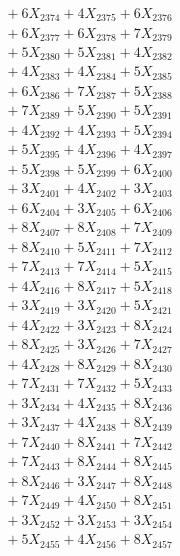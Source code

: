 \documentclass[a4paper,10pt]{article}
\begin{document}
{\begin{align}
&\;  + 6 X_{2374} + 4 X_{2375} + 6 X_{2376} \\[0.3ex]
&\;  + 6 X_{2377} + 6 X_{2378} + 7 X_{2379} \\[0.5ex]\allowbreak
&\;  + 5 X_{2380} + 5 X_{2381} + 4 X_{2382} \\[0.3ex]
&\;  + 4 X_{2383} + 4 X_{2384} + 5 X_{2385} \\[0.3ex]
&\;  + 6 X_{2386} + 7 X_{2387} + 5 X_{2388} \\[0.3ex]
&\;  + 7 X_{2389} + 5 X_{2390} + 5 X_{2391} \\[0.3ex]
&\;  + 4 X_{2392} + 4 X_{2393} + 5 X_{2394} \\[0.3ex]
&\;  + 5 X_{2395} + 4 X_{2396} + 4 X_{2397} \\[0.3ex]
&\;  + 5 X_{2398} + 5 X_{2399} + 6 X_{2400} \\[0.3ex]
&\;  + 3 X_{2401} + 4 X_{2402} + 3 X_{2403} \\[0.3ex]
&\;  + 6 X_{2404} + 3 X_{2405} + 6 X_{2406} \\[0.3ex]
&\;  + 8 X_{2407} + 8 X_{2408} + 7 X_{2409} \\[0.5ex]\allowbreak
&\;  + 8 X_{2410} + 5 X_{2411} + 7 X_{2412} \\[0.3ex]
&\;  + 7 X_{2413} + 7 X_{2414} + 5 X_{2415} \\[0.3ex]
&\;  + 4 X_{2416} + 8 X_{2417} + 5 X_{2418} \\[0.3ex]
&\;  + 3 X_{2419} + 3 X_{2420} + 5 X_{2421} \\[0.3ex]
&\;  + 4 X_{2422} + 3 X_{2423} + 8 X_{2424} \\[0.3ex]
&\;  + 8 X_{2425} + 3 X_{2426} + 7 X_{2427} \\[0.3ex]
&\;  + 4 X_{2428} + 8 X_{2429} + 8 X_{2430} \\[0.3ex]
&\;  + 7 X_{2431} + 7 X_{2432} + 5 X_{2433} \\[0.3ex]
&\;  + 3 X_{2434} + 4 X_{2435} + 8 X_{2436} \\[0.3ex]
&\;  + 3 X_{2437} + 4 X_{2438} + 8 X_{2439} \\[0.5ex]\allowbreak
&\;  + 7 X_{2440} + 8 X_{2441} + 7 X_{2442} \\[0.3ex]
&\;  + 7 X_{2443} + 8 X_{2444} + 8 X_{2445} \\[0.3ex]
&\;  + 8 X_{2446} + 3 X_{2447} + 8 X_{2448} \\[0.3ex]
&\;  + 7 X_{2449} + 4 X_{2450} + 8 X_{2451} \\[0.3ex]
&\;  + 3 X_{2452} + 3 X_{2453} + 3 X_{2454} \\[0.3ex]
&\;  + 5 X_{2455} + 4 X_{2456} + 8 X_{2457} \\[0.3ex]

\end{align}}
\end{document}
